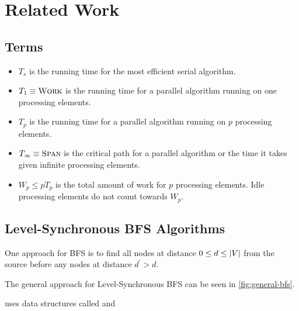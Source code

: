 \section{Related Work}

\subsection{Terms}
\begin{itemize}
    \item $T_s$ is the running time for the most efficient serial algorithm.
    \item $T_1 \equiv \relax{\textrm{\bf{\sc{Work}}}}$ is the running time for a parallel algorithm running on one processing elements.
    \item $T_p$ is the running time for a parallel algorithm running on $p$ processing elements.
    \item $T_\infty \equiv \relax{\textrm{\bf{\sc{Span}}}}$ is the critical path for a parallel algorithm or the time it takes given infinite processing elements.
    \item $W_p \leq pT_p$ is the total amount of work for $p$ processing elements.  Idle processing elements do not count towards $W_p$.
\end{itemize}


\subsection{Level-Synchronous BFS Algorithms}
One approach for BFS is to find all nodes at distance $0\leq d \leq \left|V\right|$ from the source before any nodes at distance $d^\prime > d$.

The general approach for Level-Synchronous BFS can be seen in \ref{fig:general-bfs}.

\cite{mit-bag} uses data structures called  and 

